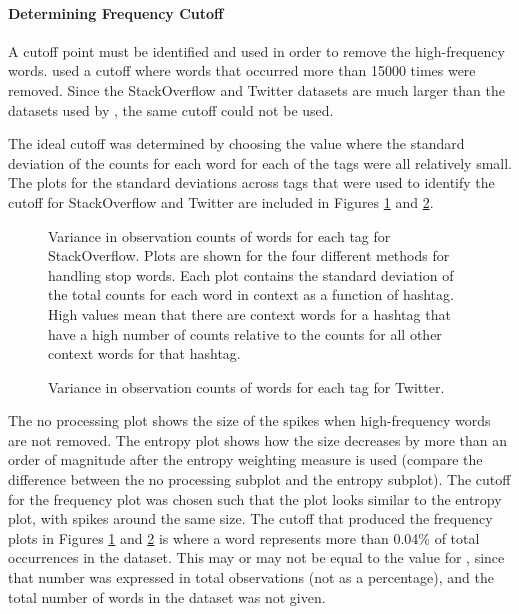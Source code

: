 \documentclass[man,floatsintext,donotrepeattitle]{apa6}
\begin{document}
\paragraph{Determining Frequency Cutoff}

A cutoff point must be identified and used in order to remove the high-frequency words.
\textcite{Sahlgren2008} used a cutoff where words that occurred more than \num{15000} times were removed.
Since the StackOverflow and Twitter datasets are much larger than the datasets used by \citeauthor{Sahlgren2008}, the same cutoff could not be used.

The ideal cutoff was determined by choosing the value where the standard deviation of the counts for each word for each of the tags were all relatively small.
The plots for the standard deviations across tags that were used to identify the cutoff for StackOverflow and Twitter are included in Figures \ref{figContextCutoffSO} and \ref{figContextCutoffT}.

\begin{figure}[!htbp]
  \caption{
    Variance in observation counts of words for each tag for StackOverflow.
    Plots are shown for the four different methods for handling stop words.
    Each plot contains the standard deviation of the total counts for each word in context as a function of hashtag.
    High values mean that there are context words for a hashtag that have a high number of counts relative to the counts for all other context words for that hashtag.
  }
  \label{figContextCutoffSO}
\end{figure}

\begin{figure}[!htbp]
  \caption{
    Variance in observation counts of words for each tag for Twitter.
  }
  \label{figContextCutoffT}
\end{figure}

The no processing plot shows the size of the spikes when high-frequency words are not removed.
The entropy plot shows how the size decreases by more than an order of magnitude after the entropy weighting measure is used (compare the difference between the no processing subplot and the entropy subplot).
The cutoff for the frequency plot was chosen such that the plot looks similar to the entropy plot, with spikes around the same size.
The cutoff that produced the frequency plots in Figures \ref{figContextCutoffSO} and \ref{figContextCutoffT} is where a word represents more than \num{.04}\% of total occurrences in the dataset.
This may or may not be equal to the value for \textcite{Sahlgren2008}, since that number was expressed in total observations (not as a percentage), and the total number of words in the dataset was not given.
\end{document}
